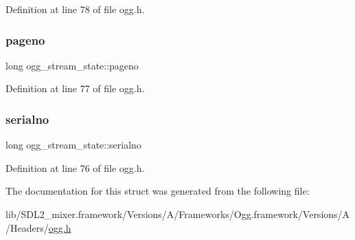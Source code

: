 Definition at line 78 of file ogg.\+h.

\mbox{\label{structogg__stream__state_a0ad3315203fcebdc2ccd3b050d28a65c}} 
\subsubsection{\texorpdfstring{pageno}{pageno}}
{\footnotesize\ttfamily long ogg\+\_\+stream\+\_\+state\+::pageno}



Definition at line 77 of file ogg.\+h.

\mbox{\label{structogg__stream__state_a79248e3f1f41cde5331909e8edd98e10}} 
\subsubsection{\texorpdfstring{serialno}{serialno}}
{\footnotesize\ttfamily long ogg\+\_\+stream\+\_\+state\+::serialno}



Definition at line 76 of file ogg.\+h.



The documentation for this struct was generated from the following file\+:\begin{DoxyCompactItemize}
\item 
lib/\+S\+D\+L2\+\_\+mixer.\+framework/\+Versions/\+A/\+Frameworks/\+Ogg.\+framework/\+Versions/\+A/\+Headers/\mbox{\hyperlink{ogg_8h}{ogg.\+h}}\end{DoxyCompactItemize}
